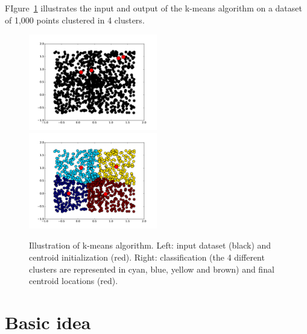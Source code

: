 \documentclass[11pt]{article}
\begin{document}
FIgure~\ref{fig:illustration} illustrates the input and output of the
k-means algorithm on a dataset of 1,000 points clustered in 4 clusters.
\begin{figure}[h]
  \includegraphics[width=0.5\textwidth]{kmeans/initialisation.pdf}
  \includegraphics[width=0.5\textwidth]{kmeans/converged.pdf}
  \label{fig:illustration}
  \caption{Illustration of k-means algorithm. Left: input dataset
    (black) and centroid initialization (red). Right: classification
    (the 4 different clusters are represented in cyan, blue, yellow and brown) and
    final centroid locations (red).}
\end{figure}

\section{Basic idea}
\end{document}
